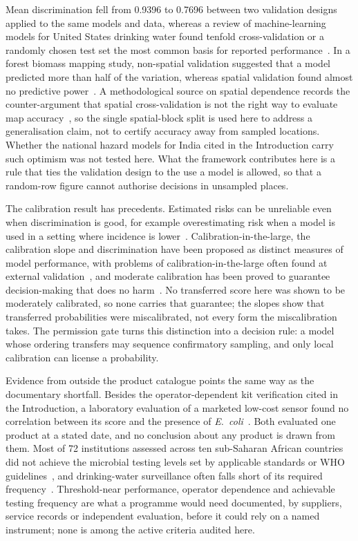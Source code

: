 \documentclass[10pt,letterpaper]{article}
\begin{document}
Mean discrimination fell from 0.9396 to 0.7696 between two validation designs applied to the same models and data, whereas a review of machine-learning models for United States drinking water found tenfold cross-validation or a randomly chosen test set the most common basis for reported performance~\cite{Hu2023}. In a forest biomass mapping study, non-spatial validation suggested that a model predicted more than half of the variation, whereas spatial validation found almost no predictive power~\cite{Ploton2020}. A methodological source on spatial dependence records the counter-argument that spatial cross-validation is not the right way to evaluate map accuracy~\cite{MeyerPebesma2022}, so the single spatial-block split is used here to address a generalisation claim, not to certify accuracy away from sampled locations. Whether the national hazard models for India cited in the Introduction carry such optimism was not tested here. What the framework contributes here is a rule that ties the validation design to the use a model is allowed, so that a random-row figure cannot authorise decisions in unsampled places.

The calibration result has precedents. Estimated risks can be unreliable even when discrimination is good, for example overestimating risk when a model is used in a setting where incidence is lower~\cite{VanCalster2019}. Calibration-in-the-large, the calibration slope and discrimination have been proposed as distinct measures of model performance, with problems of calibration-in-the-large often found at external validation~\cite{SteyerbergVergouwe2014}, and moderate calibration has been proved to guarantee decision-making that does no harm~\cite{VanCalster2016}. No transferred score here was shown to be moderately calibrated, so none carries that guarantee; the slopes show that transferred probabilities were miscalibrated, not every form the miscalibration takes. The permission gate turns this distinction into a decision rule: a model whose ordering transfers may sequence confirmatory sampling, and only local calibration can license a probability.

Evidence from outside the product catalogue points the same way as the documentary shortfall. Besides the operator-dependent kit verification cited in the Introduction, a laboratory evaluation of a marketed low-cost sensor found no correlation between its score and the presence of \textit{E.~coli}~\cite{Purvis2026-PLOSW0000442}. Both evaluated one product at a stated date, and no conclusion about any product is drawn from them. Most of 72 institutions assessed across ten sub-Saharan African countries did not achieve the microbial testing levels set by applicable standards or WHO guidelines~\cite{Peletz2016}, and drinking-water surveillance often falls short of its required frequency~\cite{GLAAS2025}. Threshold-near performance, operator dependence and achievable testing frequency are what a programme would need documented, by suppliers, service records or independent evaluation, before it could rely on a named instrument; none is among the active criteria audited here.
\end{document}
